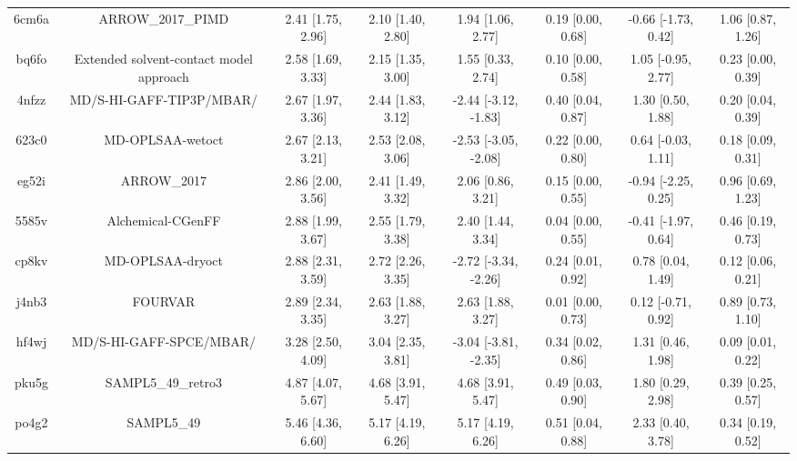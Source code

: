 \documentclass{article}
\begin{document}
\begin{center}
\begin{longtable}{|cccccccc|}
 6cm6a &                                  ARROW\_2017\_PIMD &  2.41 [1.75, 2.96] &  2.10 [1.40, 2.80] &     1.94 [1.06, 2.77] &  0.19 [0.00, 0.68] &  -0.66 [-1.73, 0.42] &     1.06 [0.87, 1.26] \\
 bq6fo &            Extended solvent-contact model approach &  2.58 [1.69, 3.33] &  2.15 [1.35, 3.00] &     1.55 [0.33, 2.74] &  0.10 [0.00, 0.58] &   1.05 [-0.95, 2.77] &     0.23 [0.00, 0.39] \\
 4nfzz &                           MD/S-HI-GAFF-TIP3P/MBAR/ &  2.67 [1.97, 3.36] &  2.44 [1.83, 3.12] &  -2.44 [-3.12, -1.83] &  0.40 [0.04, 0.87] &    1.30 [0.50, 1.88] &     0.20 [0.04, 0.39] \\
 623c0 &                                   MD-OPLSAA-wetoct &  2.67 [2.13, 3.21] &  2.53 [2.08, 3.06] &  -2.53 [-3.05, -2.08] &  0.22 [0.00, 0.80] &   0.64 [-0.03, 1.11] &     0.18 [0.09, 0.31] \\
 eg52i &                                        ARROW\_2017 &  2.86 [2.00, 3.56] &  2.41 [1.49, 3.32] &     2.06 [0.86, 3.21] &  0.15 [0.00, 0.55] &  -0.94 [-2.25, 0.25] &     0.96 [0.69, 1.23] \\
 5585v &                                  Alchemical-CGenFF &  2.88 [1.99, 3.67] &  2.55 [1.79, 3.38] &     2.40 [1.44, 3.34] &  0.04 [0.00, 0.55] &  -0.41 [-1.97, 0.64] &     0.46 [0.19, 0.73] \\
 cp8kv &                                   MD-OPLSAA-dryoct &  2.88 [2.31, 3.59] &  2.72 [2.26, 3.35] &  -2.72 [-3.34, -2.26] &  0.24 [0.01, 0.92] &    0.78 [0.04, 1.49] &     0.12 [0.06, 0.21] \\
 j4nb3 &                                            FOURVAR &  2.89 [2.34, 3.35] &  2.63 [1.88, 3.27] &     2.63 [1.88, 3.27] &  0.01 [0.00, 0.73] &   0.12 [-0.71, 0.92] &     0.89 [0.73, 1.10] \\
 hf4wj &                            MD/S-HI-GAFF-SPCE/MBAR/ &  3.28 [2.50, 4.09] &  3.04 [2.35, 3.81] &  -3.04 [-3.81, -2.35] &  0.34 [0.02, 0.86] &    1.31 [0.46, 1.98] &     0.09 [0.01, 0.22] \\
 pku5g &                                 SAMPL5\_49\_retro3 &  4.87 [4.07, 5.67] &  4.68 [3.91, 5.47] &     4.68 [3.91, 5.47] &  0.49 [0.03, 0.90] &    1.80 [0.29, 2.98] &     0.39 [0.25, 0.57] \\
 po4g2 &                                         SAMPL5\_49 &  5.46 [4.36, 6.60] &  5.17 [4.19, 6.26] &     5.17 [4.19, 6.26] &  0.51 [0.04, 0.88] &    2.33 [0.40, 3.78] &     0.34 [0.19, 0.52] \\
\end{longtable}
\end{center}
\end{document}
